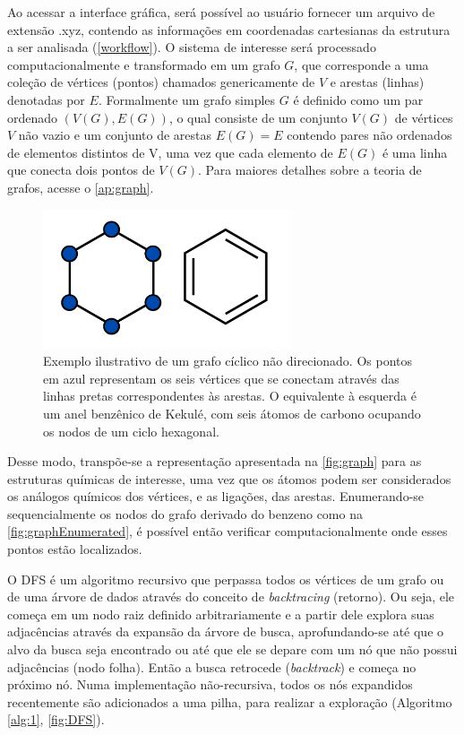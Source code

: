 Ao acessar a interface gráfica, será possível ao usuário fornecer um arquivo de extensão .xyz, contendo as informações em coordenadas cartesianas da estrutura a ser analisada (\autoref{workflow}). O sistema de interesse será processado computacionalmente e transformado em um grafo $G$, que corresponde a uma coleção de vértices (pontos) chamados genericamente de $V$ e arestas (linhas) denotadas por $E$. Formalmente um grafo simples $G$ é definido como um par ordenado $(V(G), E(G))$, o qual consiste de um conjunto $V(G)$ de vértices $V$ não vazio e um conjunto de arestas $E(G) = E$ contendo pares não ordenados de elementos distintos de V, uma vez que cada elemento de $E(G)$ é uma linha que conecta dois pontos de $V(G)$. Para maiores detalhes sobre a teoria de grafos, acesse o \autoref{ap:graph}.

\begin{figure}[htb]
	\caption{\label{fig:M2} Exemplo ilustrativo de um grafo cíclico não direcionado. Os pontos em azul representam os seis vértices que se conectam através das linhas pretas correspondentes às arestas. O equivalente à esquerda é um anel benzênico de Kekulé, com seis átomos de carbono ocupando os nodos de um ciclo hexagonal.}
	\begin{center}
		\includegraphics[width=0.65\textwidth]{images/grafo(2).png}
	\end{center}
\end{figure}

Desse modo, transpõe-se a representação apresentada na \autoref{fig:graph} para as estruturas químicas de interesse, uma vez que os átomos podem ser considerados os análogos químicos dos vértices, e as ligações, das arestas. Enumerando-se sequencialmente os nodos do grafo derivado do benzeno como na \autoref{fig:graphEnumerated}, é possível então verificar computacionalmente onde esses pontos estão localizados.

O \gls{DFS}\autocite{Knuth1997-jf, Goodrich2001-pd} é um algoritmo recursivo que perpassa todos os vértices de um grafo ou de uma árvore de dados através do conceito de \textit{backtracing} (retorno). Ou seja, ele começa em um nodo raiz definido arbitrariamente e a partir dele explora suas adjacências através da expansão da árvore de busca, aprofundando-se até que o alvo da busca seja encontrado ou até que ele se depare com um nó que não possui adjacências (nodo folha). Então a busca retrocede (\textit{backtrack}) e começa no próximo nó. Numa implementação não-recursiva, todos os nós expandidos recentemente são adicionados a uma pilha, para realizar a exploração (Algoritmo \ref{alg:1}, \autoref{fig:DFS}).

